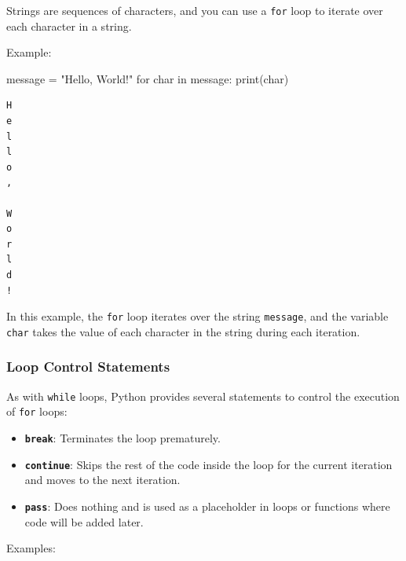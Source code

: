 \documentclass[
  letterpaper,
  DIV=11,
  numbers=noendperiod]{scrreprt}
\newenvironment{Shaded}{\begin{snugshade}}{\end{snugshade}}
\newcommand{\BuiltInTok}[1]{\textcolor[rgb]{0.00,0.23,0.31}{#1}}
\newcommand{\ControlFlowTok}[1]{\textcolor[rgb]{0.00,0.23,0.31}{#1}}
\newcommand{\KeywordTok}[1]{\textcolor[rgb]{0.00,0.23,0.31}{#1}}
\newcommand{\NormalTok}[1]{\textcolor[rgb]{0.00,0.23,0.31}{#1}}
\newcommand{\OperatorTok}[1]{\textcolor[rgb]{0.37,0.37,0.37}{#1}}
\newcommand{\StringTok}[1]{\textcolor[rgb]{0.13,0.47,0.30}{#1}}
\providecommand{\tightlist}{%
  \setlength{\itemsep}{0pt}\setlength{\parskip}{0pt}}\usepackage{longtable,booktabs,array}
\begin{document}
Strings are sequences of characters, and you can use a \texttt{for} loop
to iterate over each character in a string.

Example:

\begin{Shaded}
\begin{Highlighting}[]
\NormalTok{message }\OperatorTok{=} \StringTok{"Hello, World!"}
\ControlFlowTok{for}\NormalTok{ char }\KeywordTok{in}\NormalTok{ message:}
    \BuiltInTok{print}\NormalTok{(char)}
\end{Highlighting}
\end{Shaded}

\begin{verbatim}
H
e
l
l
o
,
 
W
o
r
l
d
!
\end{verbatim}

In this example, the \texttt{for} loop iterates over the string
\texttt{message}, and the variable \texttt{char} takes the value of each
character in the string during each iteration.

\hypertarget{loop-control-statements}{%
\subsubsection{Loop Control Statements}\label{loop-control-statements}}

As with \texttt{while} loops, Python provides several statements to
control the execution of \texttt{for} loops:

\begin{itemize}
\tightlist
\item
  \textbf{\texttt{break}}: Terminates the loop prematurely.
\item
  \textbf{\texttt{continue}}: Skips the rest of the code inside the loop
  for the current iteration and moves to the next iteration.
\item
  \textbf{\texttt{pass}}: Does nothing and is used as a placeholder in
  loops or functions where code will be added later.
\end{itemize}

Examples:
\end{document}
